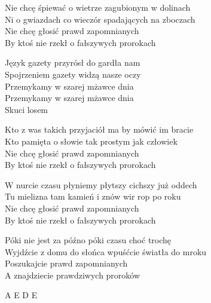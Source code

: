 
\begin{text}
    Nie chcę śpiewać o wietrze zagubionym w dolinach\\
    Ni o gwiazdach co wieczór spadających na zboczach\\
    Nie chcę głosić prawd zapomnianych\\
    By ktoś nie rzekł o fałszywych prorokach

    \vin Język gazety przyrósł do gardła nam\\
    \vin Spojrzeniem gazety widzą nasze oczy\\
    \vin Przemykamy w szarej mżawce dnia\\
    \vin Przemykamy w szarej mżawce dnia\\
    \vin Skuci losem

    Kto z was takich przyjaciół ma by mówić im bracie\\
    Kto pamięta o słowie tak prostym jak człowiek\\
    Nie chcę głosić prawd zapomnianych\\
    By ktoś nie rzekł o fałszywych prorokach

    W nurcie czasu płyniemy płytszy cichszy już oddech\\
    Tu mielizna tam kamień i znów wir rop po roku\\
    Nie chcę głosić prawd zapomnianych\\
    By ktoś nie rzekł o fałszywych prorokach

    Póki nie jest za późno póki czasu choć trochę\\
    Wyjdźcie z domu do słońca wpuśćcie światła do mroku\\
    Poszukajcie prawd zapomnianych\\
    A znajdziecie prawdziwych proroków
\end{text}
\begin{chord}
    A E D E
\end{chord}